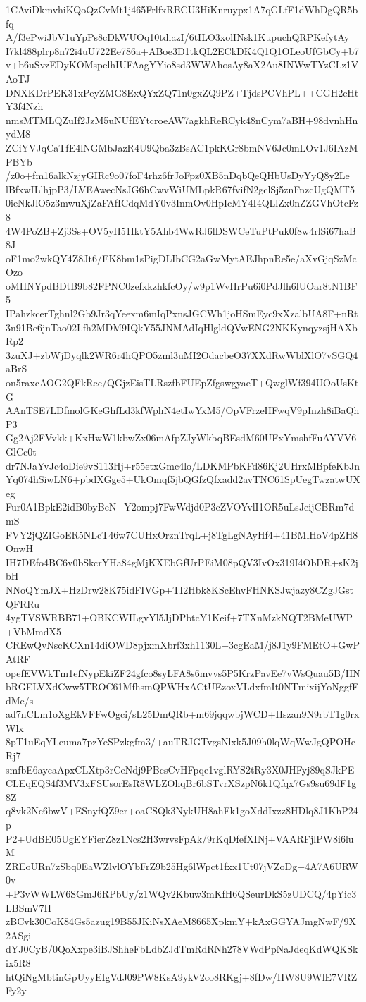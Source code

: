 1CAviDkmvhiKQoQzCvMt1j465FrlfxRBCU3HiKnruypx1A7qGLfF1dWhDgQR5bfq
A/f3ePwiJbV1uYpPs8cDkWUOq10tdiazI/6tILO3xolINsk1KupuchQRPKefytAy
I7kl488plrp8n72i4uU722Ee786a+ABoe3D1tkQL2ECkDK4Q1Q1OLeoUfGbCy+b7
v+b6uSvzEDyKOMspelhIUFAagYYio8sd3WWAhosAy8aX2Au8INWwTYzCLz1VAoTJ
DNXKDrPEK31xPeyZMG8ExQYxZQ71n0gxZQ9PZ+TjdsPCVhPL++CGH2cHtY3f4Nzh
nmsMTMLQZuIf2JzM5uNUfEYtcroeAW7agkhReRCyk48nCym7aBH+98dvnhHnydM8
ZCiYVJqCaTfE4lNGMbJazR4U9Qba3zBsAC1pkKGr8bmNV6Jc0mLOv1J6IAzMPBYb
/z0o+fm16alkNzjyGIRc9o07foF4rhz6frJoFpz0XB5nDqbQeQHbUsDyYyQ8y2Le
lBfxwILlhjpP3/LVEAwecNsJG6hCwvWiUMLpkR67fvifN2gclSj5znFnzcUgQMT5
0ieNkJlO5z3mwuXjZaFAfICdqMdY0v3InmOv0HpIcMY4I4QLlZx0nZZGVhOtcFz8
4W4PoZB+Zj3Ss+OV5yH51IktY5Ahb4WwRJ6lDSWCeTuPtPuk0f8w4rlSi67haB8J
oF1mo2wkQY4Z8Jt6/EK8bm1sPigDLIbCG2aGwMytAEJhpnRe5e/aXvGjqSzMcOzo
oMHNYpdBDtB9b82FPNC0zefxkzhkfcOy/w9p1WvHrPu6i0PdJlh6lUOar8tN1BF5
IPahzkcerTghnl2Gb9Jr3qYeexm6mIqPxnsJGCWh1joHSmEyc9xXzalbUA8F+nRt
3n91Be6jnTao02Lfh2MDM9IQkY55JNMAdIqHlgldQVwENG2NKKynqyzsjHAXbRp2
3zuXJ+zbWjDyqlk2WR6r4hQPO5zml3uMI2OdacbeO37XXdRwWblXlO7vSGQ4aBrS
on5raxcAOG2QFkRec/QGjzEisTLRszfbFUEpZfgswgyaeT+QwglWf394UOoUsKtG
AAnTSE7LDfmolGKeGhfLd3kfWphN4etIwYxM5/OpVFrzeHFwqV9pInzh8iBaQhP3
Gg2Aj2FVvkk+KxHwW1kbwZx06mAfpZJyWkbqBEsdM60UFxYmshfFuAYVV6GlCc0t
dr7NJaYvJc4oDie9vS113Hj+r55etxGmc4lo/LDKMPbKFd86Kj2UHrxMBpfeKbJn
Yq074hSiwLN6+pbdXGge5+UkOmqf5jbQGfzQfxadd2avTNC61SpUegTwzatwUXeg
Fur0A1BpkE2idB0byBeN+Y2ompj7FwWdjd0P3cZVOYvlI1OR5uLsJeijCBRm7dmS
FVY2jQZIGoER5NLcT46w7CUHxOrznTrqL+j8TgLgNAyHf4+41BMlHoV4pZH8OnwH
IH7DEfo4BC6v0bSkcrYHa84gMjKXEbGfUrPEiM08pQV3IvOx319I4ObDR+sK2jbH
NNoQYmJX+HzDrw28K75idFIVGp+TI2Hbk8KScEhvFHNKSJwjazy8CZgJGstQFRRu
4ygTVSWRBB71+OBKCWILgvYl5JjDPbtcY1Keif+7TXnMzkNQT2BMeUWP+VbMmdX5
CREwQvNscKCXn14diOWD8pjxmXbrf3xh1130L+3cgEaM/j8J1y9FMEtO+GwPAtRF
opefEVWkTm1efNypEkiZF24gfco8syLFA8s6mvvs5P5KrzPavEe7vWsQuau5B/HN
bRGELVXdCww5TROC61MfhsmQPWHxACtUEzoxVLdxfmIt0NTmixijYoNggfFdMe/s
ad7nCLm1oXgEkVFFwOgci/sL25DmQRb+m69jqqwbjWCD+Hszan9N9rbT1g0rxWlx
8pT1uEqYLeuma7pzYeSPzkgfm3/+auTRJGTvgsNlxk5J09h0lqWqWwJgQPOHeRj7
smfbE6aycaApxCLXtp3rCeNdj9PBcsCvHFpqe1vglRYS2tRy3X0JHFyj89qSJkPE
CLEqEQS4f3MV3xFSUsorEsR8WLZOhqBr6bSTvrXSzpN6k1Qfqx7Gs9su69dF1g8Z
q8vk2Nc6bwV+ESnyfQZ9er+oaCSQk3NykUH8ahFk1goXddIxzz8HDlq8J1KhP24p
P2+UdBE05UgEYFierZ8z1Ncs2H3wrvsFpAk/9rKqDfefXINj+VAARFjlPW8i6luM
ZREoURn7zSbq0EaWZlvlOYbFrZ9b25Hg6lWpct1fxx1Ut07jVZoDg+4A7A6URW0v
+P3vWWLW6SGmJ6RPbUy/z1WQv2Kbuw3mKfH6QSeurDkS5zUDCQ/4pYic3LBSmV7H
zBCvk30CoK84Gs5azug19B55JKiNsXAeM8665XpkmY+kAxGGYAJmgNwF/9X2ASgi
dYJ0CyB/0QoXxpe3iBJShheFbLdbZJdTmRdRNh278VWdPpNaJdeqKdWQKSkix5R8
htQiNgMbtinGpUyyEIgVdJ09PW8KsA9ykV2co8RKgj+8fDw/HW8U9WlE7VRZFy2y
